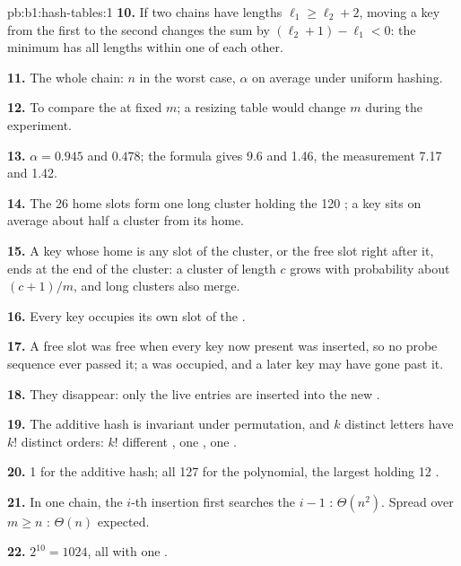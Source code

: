 \begin{solution}{pb:b1:hash-tables:1}
\textbf{10.} If two chains have lengths $\ell_1 \geq \ell_2 + 2$, moving a key from the first to the second changes the
sum by $(\ell_2 + 1) - \ell_1 < 0$: the minimum has all lengths within one of each other.

\textbf{11.} The whole chain: $n$ in the worst case, $\alpha$ on average under uniform hashing.

\textbf{12.} To compare the  at fixed $m$; a resizing table would change $m$ during the experiment.

\textbf{13.} $\alpha = 0.945$ and $0.478$; the formula gives 9.6 and 1.46, the measurement 7.17 and 1.42.

\textbf{14.} The 26 home slots form one long cluster holding the 120 ; a key sits on average about half a cluster
from its home.

\textbf{15.} A key whose home is any slot of the cluster, or the free slot right after it, ends at the end of the
cluster: a cluster of length $c$ grows with probability about $(c + 1)/m$, and long clusters also merge.

\textbf{16.} Every key occupies its own slot of the .

\textbf{17.} A free slot was free when every key now present was inserted, so no probe sequence ever passed it; a
 was occupied, and a later key may have gone past it.

\textbf{18.} They disappear: only the live entries are inserted into the new .

\textbf{19.} The additive hash is invariant under permutation, and $k$ distinct letters have $k!$ distinct orders: $k!$
different , one , one .

\textbf{20.} 1  for the additive hash; all 127 for the polynomial, the largest holding 12 .

\textbf{21.} In one chain, the $i$-th insertion first searches the $i - 1$ : $\Theta(n^2)$. Spread over $m \geq n$
: $\Theta(n)$ expected.

\textbf{22.} $2^{10} = 1024$, all with one .


\end{solution}
